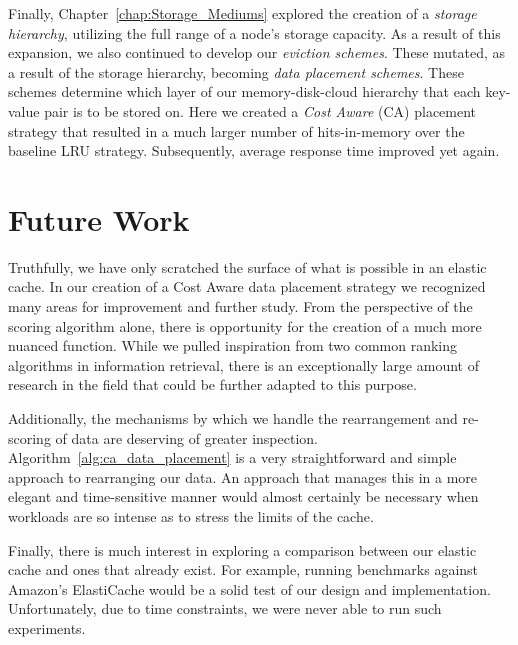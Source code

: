 Finally, Chapter~\ref{chap:Storage_Mediums} explored the creation of a
\emph{storage hierarchy}, utilizing the full range of a node's storage
capacity. As a result of this expansion, we also continued to develop our
\emph{eviction schemes}. These mutated, as a result of the storage hierarchy,
becoming \emph{data placement schemes}. These schemes determine which layer of
our memory-disk-cloud hierarchy that each key-value pair is to be stored on.
Here we created a \emph{Cost Aware} (CA) placement strategy that resulted in a
much larger number of hits-in-memory over the baseline LRU strategy.
Subsequently, average response time improved yet again.


\section{Future Work} %
\label{sec:future_work}
Truthfully, we have only scratched the surface of what is possible in an
elastic cache. In our creation of a Cost Aware data placement strategy we
recognized many areas for improvement and further study. From the perspective
of the scoring algorithm alone, there is opportunity for the creation of a much
more nuanced function. While we pulled inspiration from two common ranking
algorithms in information retrieval\cite{tfidf,bm25}, there is an exceptionally
large amount of research in the field that could be further adapted to this
purpose.

Additionally, the mechanisms by which we handle the rearrangement and
re-scoring of data are deserving of greater inspection.
Algorithm~\ref{alg:ca_data_placement} is a very straightforward and simple
approach to rearranging our data. An approach that manages this in a more
elegant and time-sensitive manner would almost certainly be necessary when
workloads are so intense as to stress the limits of the cache.

Finally, there is much interest in exploring a comparison between our elastic
cache and ones that already exist. For example, running benchmarks against
Amazon's ElastiCache\cite{amazonElastiCache} would be a solid test of our
design and implementation. Unfortunately, due to time constraints, we were
never able to run such experiments.

